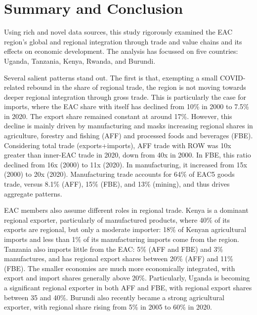 \documentclass[a4paper]{article}
\begin{document}
\newpage

\section{Summary and Conclusion} 

Using rich and novel data sources, this study rigorously examined the EAC region's global and regional integration through trade and value chains and its effects on economic development. The analysis has focussed on five countries: Uganda, Tanzania, Kenya, Rwanda, and Burundi. \newline

Several salient patterns stand out. The first is that, exempting a small COVID-related rebound in the share of regional trade, the region is not moving towards deeper regional integration through gross trade. This is particularly the case for imports, where the EAC share with itself has declined from 10\% in 2000 to 7.5\% in 2020. The export share remained constant at around 17\%. However, this decline is mainly driven by manufacturing and masks increasing regional shares in agriculture, forestry and fishing (AFF) and processed foods and beverages (FBE). Considering total trade (exports+imports), AFF trade with ROW was 10x greater than inner-EAC trade in 2020, down from 40x in 2000. In FBE, this ratio declined from 16x (2000) to 11x (2020). In manufacturing, it increased from 15x (2000) to 20x (2020). Manufacturing trade accounts for 64\% of EAC5 goods trade, versus  8.1\% (AFF), 15\% (FBE), and 13\% (mining), and thus drives aggregate patterns. \newline 

EAC members also assume different roles in regional trade. Kenya is a dominant regional exporter, particularly of manufactured products, where 40\% of its exports are regional, but only a moderate importer: 18\% of Kenyan agricultural imports and less than 1\% of its manufacturing imports come from the region. Tanzania also imports little from the EAC: 5\% (AFF and FBE) and 3\% manufactures, and has regional export shares between 20\% (AFF) and 11\% (FBE). The smaller economies are much more economically integrated, with export and import shares generally above 20\%. Particularly, Uganda is becoming a significant regional exporter in both AFF and FBE, with regional export shares between 35 and 40\%. Burundi also recently became a strong agricultural exporter, with regional share rising from 5\% in 2005 to 60\% in 2020. \newline
\end{document}

